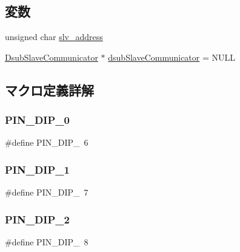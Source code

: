 \subsection*{変数}
\begin{DoxyCompactItemize}
\item 
unsigned char \mbox{\hyperlink{slave__template_8ino_aeba7e981bd419ac0d5ca8e5e4198bf06}{slv\+\_\+address}}
\item 
\mbox{\hyperlink{class_dsub_slave_communicator}{Dsub\+Slave\+Communicator}} $\ast$ \mbox{\hyperlink{slave__template_8ino_adb2253a9db904473e0b317580548c627}{dsub\+Slave\+Communicator}} = N\+U\+LL
\end{DoxyCompactItemize}


\subsection{マクロ定義詳解}
\mbox{\label{slave__template_8ino_a1865ea46eaf057c61c9661e6777e617b}} 
\subsubsection{\texorpdfstring{PIN\_DIP\_0}{PIN\_DIP\_0}}
{\footnotesize\ttfamily \#define P\+I\+N\+\_\+\+D\+I\+P\+\_~6}

\mbox{\label{slave__template_8ino_aad6f8823636ffe5bee61d57219a18f53}} 
\subsubsection{\texorpdfstring{PIN\_DIP\_1}{PIN\_DIP\_1}}
{\footnotesize\ttfamily \#define P\+I\+N\+\_\+\+D\+I\+P\+\_~7}

\mbox{\label{slave__template_8ino_af0b38ba5f8b9c96b3a1f03b00382739c}} 
\subsubsection{\texorpdfstring{PIN\_DIP\_2}{PIN\_DIP\_2}}
{\footnotesize\ttfamily \#define P\+I\+N\+\_\+\+D\+I\+P\+\_~8}


